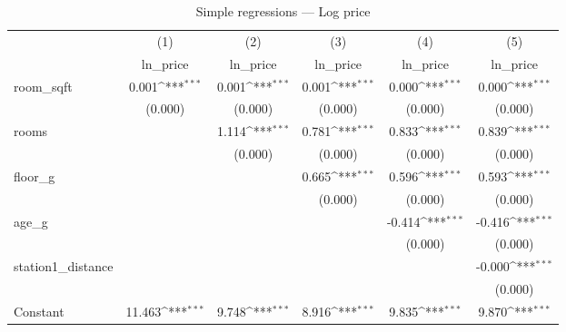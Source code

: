 \begin{table}[H]\centering
\def\sym#1{\ifmmode^{#1}\else\(^{#1}\)\fi}
\caption{Simple regressions — Log price}
\begin{tabular}{l*{5}{c}}
\toprule
                    &\multicolumn{1}{c}{(1)}&\multicolumn{1}{c}{(2)}&\multicolumn{1}{c}{(3)}&\multicolumn{1}{c}{(4)}&\multicolumn{1}{c}{(5)}\\
                    &\multicolumn{1}{c}{ln\_price}&\multicolumn{1}{c}{ln\_price}&\multicolumn{1}{c}{ln\_price}&\multicolumn{1}{c}{ln\_price}&\multicolumn{1}{c}{ln\_price}\\
\midrule
room\_sqft           &       0.001\sym{***}&       0.001\sym{***}&       0.001\sym{***}&       0.000\sym{***}&       0.000\sym{***}\\
                    &     (0.000)         &     (0.000)         &     (0.000)         &     (0.000)         &     (0.000)         \\
\addlinespace
rooms               &                     &       1.114\sym{***}&       0.781\sym{***}&       0.833\sym{***}&       0.839\sym{***}\\
                    &                     &     (0.000)         &     (0.000)         &     (0.000)         &     (0.000)         \\
\addlinespace
floor\_g             &                     &                     &       0.665\sym{***}&       0.596\sym{***}&       0.593\sym{***}\\
                    &                     &                     &     (0.000)         &     (0.000)         &     (0.000)         \\
\addlinespace
age\_g               &                     &                     &                     &      -0.414\sym{***}&      -0.416\sym{***}\\
                    &                     &                     &                     &     (0.000)         &     (0.000)         \\
\addlinespace
station1\_distance   &                     &                     &                     &                     &      -0.000\sym{***}\\
                    &                     &                     &                     &                     &     (0.000)         \\
\addlinespace
Constant            &      11.463\sym{***}&       9.748\sym{***}&       8.916\sym{***}&       9.835\sym{***}&       9.870\sym{***}\\

\end{tabular}
\end{table}
